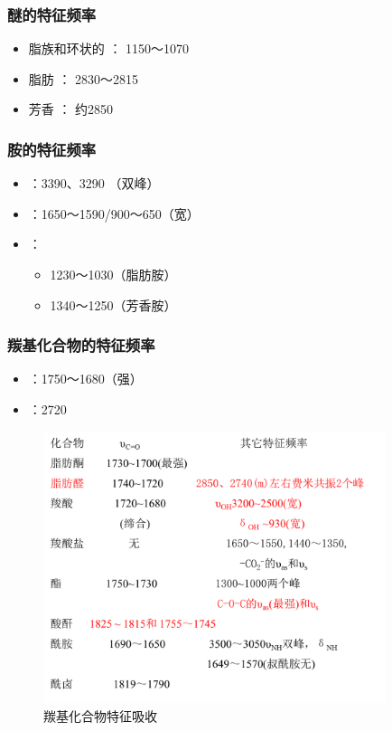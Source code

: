 \subsubsection*{醚的特征频率}          
\begin{itemize}         
	\item 脂族和环状的 ： 1150～1070
    \item 脂肪     ：   2830～2815
    \item 芳香    ：  约2850
\end{itemize}
\subsubsection*{胺的特征频率}
\begin{itemize}                  
    \item {}：3390、3290 （双峰）
    \item {}：1650～1590/900～650（宽）
    \item {}：
    \begin{itemize}
        \item 1230～1030（脂肪胺）
        \item 1340～1250（芳香胺）
    \end{itemize}
\end{itemize}
\subsubsection*{羰基化合物的特征频率}
\begin{itemize}  
    \item {}：1750～1680（强）
    \item {}：2720
\end{itemize}
\begin{figure}[ht]
    \centering
    \includegraphics[width=10cm]{image/chp5_co.png}
    \caption{羰基化合物特征吸收}
    \label{fig:chp5_co}


\end{figure}

